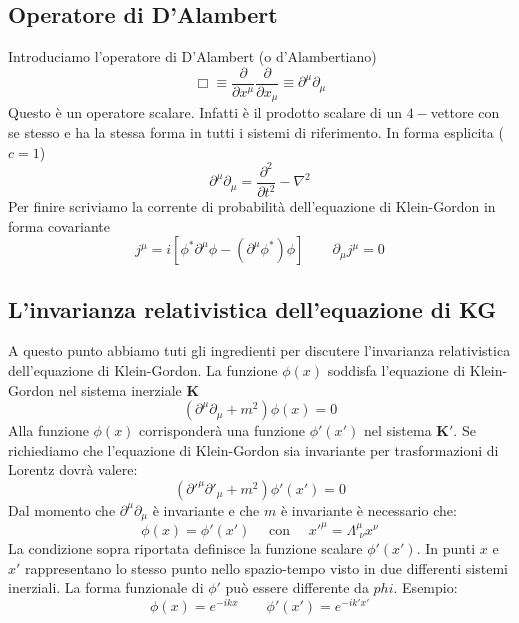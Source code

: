 \subsection{Operatore di D'Alambert}
Introduciamo l'operatore di D'Alambert (o d'Alambertiano)
\begin{equation}
    \Box\equiv\frac{\partial}{\partial x^\mu}\frac{\partial}{\partial x_\mu}\equiv\partial^\mu\partial_\mu
\end{equation}
Questo è un operatore scalare. Infatti è il prodotto scalare di un $4-$vettore con se stesso e ha la stessa forma in tutti i sistemi di riferimento. In forma esplicita ($c=1$)
\begin{equation}
    \partial^\mu\partial_\mu=\frac{\partial^2}{\partial t^2}-\nabla^2
\end{equation}
Per finire scriviamo la corrente di probabilità dell'equazione di Klein-Gordon in forma covariante
\begin{equation}
    j^\mu=i\left[\phi^*\partial^\mu\phi-\left(\partial^\mu\phi^*\right)\phi\right]\qquad \partial_\mu j^\mu=0
\end{equation}
\subsection{L'invarianza relativistica dell'equazione di KG}
A questo punto abbiamo tuti gli ingredienti per discutere l'invarianza relativistica dell'equazione di Klein-Gordon. La funzione $\phi(x)$ soddisfa l'equazione di Klein-Gordon nel sistema inerziale $\mathbf{K}$
\begin{equation}
    \left(\partial^\mu\partial_\mu+m^2\right)\phi(x)=0
\end{equation}
Alla funzione $\phi(x)$ corrisponderà una funzione $\phi'(x')$ nel sistema $\mathbf{K}'$. Se richiediamo che l'equazione di Klein-Gordon sia invariante per trasformazioni di Lorentz dovrà valere:
\begin{equation}
        \left(\partial'^\mu\partial'_\mu+m^2\right)\phi'(x')=0
\end{equation}
Dal momento che $\partial^\mu\partial_\mu$ è invariante e che $m$ è invariante è necessario che:
\begin{equation*}
    \phi(x)=\phi'(x')\quad \text{ con } \quad x'^\mu = \Lambda^\mu_{\,\,\nu} x^\nu
\end{equation*}
La condizione sopra riportata definisce la funzione scalare $\phi'(x')$. In punti $x$ e $x'$ rappresentano lo stesso punto nello spazio-tempo visto in due differenti sistemi inerziali. La forma funzionale di $\phi'$ può essere differente da $phi$. Esempio:
\begin{equation*}
    \phi(x)=e^{-ikx} \qquad \phi'(x')=e^{-ik'x'}
\end{equation*}
